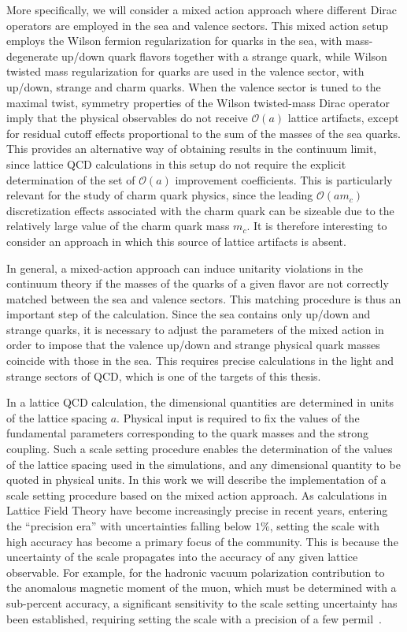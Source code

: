 More specifically, we will consider a mixed action approach where different Dirac operators are employed in the sea and valence sectors. This mixed action setup employs the Wilson fermion regularization for quarks in the sea, with mass-degenerate up/down quark flavors together with a strange quark, while Wilson twisted mass regularization for quarks are used in the valence sector, with up/down, strange and charm quarks. When the valence sector is tuned to the maximal twist, symmetry properties of the Wilson twisted-mass Dirac operator imply that the physical observables do not receive $\mathcal{O}(a)$ lattice artifacts, except for residual cutoff effects proportional to the sum of the masses of the sea quarks.
This provides an alternative way of obtaining results in the continuum limit, since lattice QCD calculations in this setup do not require the explicit determination of the set of $\mathcal{O}(a)$ improvement coefficients. This is particularly relevant for the study of charm quark physics, since the leading $\mathcal{O}(am_c)$ discretization effects associated with the charm quark can be sizeable due to the relatively large value of the charm quark mass $m_c$.  It is therefore interesting to consider an approach in which this source of lattice artifacts is absent.

In general, a mixed-action approach can induce unitarity violations in the continuum theory if the masses of the quarks of a given flavor are not correctly matched between the sea and valence sectors. This matching procedure is thus an important step of the calculation. Since the sea contains only up/down and strange quarks, it is necessary to adjust the parameters of the mixed action in order to impose that the valence up/down and strange physical quark masses coincide with those in the sea. This requires precise calculations in the light and strange sectors of QCD, which is one of the targets of this thesis.

In a lattice QCD calculation, the dimensional quantities are determined in units of the lattice spacing $a$. Physical input is required to fix the values of the fundamental parameters corresponding to the quark masses and the strong coupling. Such a scale setting procedure enables the determination of the values of  the lattice spacing used in the simulations, and any dimensional quantity to be quoted in physical units. In this work we will describe the implementation of a scale setting procedure based on the mixed action approach. As calculations in Lattice Field Theory have become increasingly precise in recent years, entering the ``precision era'' with uncertainties falling below $1\%$, setting the scale with high accuracy has become a primary focus of the community. This is because the uncertainty of the scale propagates into the accuracy of any given lattice observable. For example, for the hadronic  vacuum polarization contribution to the anomalous magnetic moment of the muon, which must be determined with a sub-percent accuracy, a significant sensitivity to the scale setting uncertainty has been established, requiring setting the scale with a precision of a few permil~\citep{Borsanyi:2020mff}.

